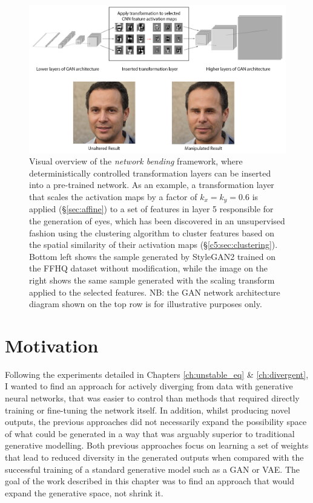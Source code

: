 \begin{figure}[!htb]
    \centering
    \includegraphics[width=1\textwidth]{figures/c5_netbend/misc/network-bending-diagram.png}
    \caption[Visual overview of the \textit{network bending} framework]{Visual overview of the \textit{network bending} framework, where deterministically controlled transformation layers can be inserted into a pre-trained network. As an example, a transformation layer that scales the activation maps by a factor of $k_x=k_y=0.6$ is applied (\S\ref{sec:affine}) to a set of features in layer 5 responsible for the generation of eyes, which has been discovered in an unsupervised fashion using the clustering algorithm to cluster features based on the spatial similarity of their activation maps (\S \ref{c5:sec:clustering}). Bottom left shows the sample generated by StyleGAN2 \citep{karras2019analyzing} trained on the FFHQ dataset without modification, while the image on the right shows the same sample generated with the scaling transform applied to the selected features. NB: the GAN network architecture diagram shown on the top row is for illustrative purposes only.}
    \label{fig:c5:overview_diagram}
\end{figure}

\section{Motivation}

Following the experiments detailed in Chapters \ref{ch:unstable_eq} \& \ref{ch:divergent}, I wanted to find an approach for actively diverging from data with generative neural networks, that was easier to control than methods that required directly training or fine-tuning the network itself.
In addition, whilst producing novel outputs, the previous approaches did not necessarily expand the possibility space of what could be generated in a way that was arguably superior to traditional generative modelling.
Both previous approaches focus on learning a set of weights that lead to reduced diversity in the generated outputs when compared with the successful training of a standard generative model such as a GAN or VAE.
The goal of the work described in this chapter was to find an approach that would expand the generative space, not shrink it. 


